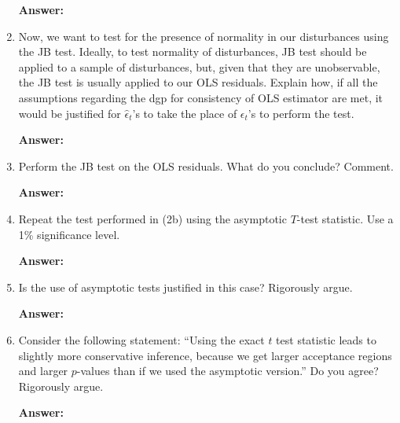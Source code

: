 \documentclass[12pt,a4paper]{article}
\begin{document}
\begin{enumerate}[label=(\alph*)]
  \textbf{Answer:} 
  
  \item Now, we want to test for the presence of normality in our disturbances using the JB test. Ideally, to test normality of disturbances, JB test should be applied to a sample of disturbances, but, given that they are unobservable, the JB test is usually applied to our OLS residuals. Explain how, if all the assumptions regarding the dgp for consistency of OLS estimator are met, it would be justified for $\hat{\epsilon}_t$'s to take the place of $\epsilon_t$'s to perform the test.
  
  \textbf{Answer:} 
  
  \item Perform the JB test on the OLS residuals. What do you conclude? Comment.
  
  \textbf{Answer:} 
  
  \item Repeat the test performed in (2b) using the asymptotic $T$-test statistic. Use a 1\% significance level.
  
  \textbf{Answer:} 
  
  \item Is the use of asymptotic tests justified in this case? Rigorously argue.
  
  \textbf{Answer:} 
  
  \item Consider the following statement: ``Using the exact $t$ test statistic leads to slightly more conservative inference, because we get larger acceptance regions and larger $p$-values than if we used the asymptotic version.'' Do you agree? Rigorously argue.
  
  \textbf{Answer:} 
\end{enumerate}
\end{document}
